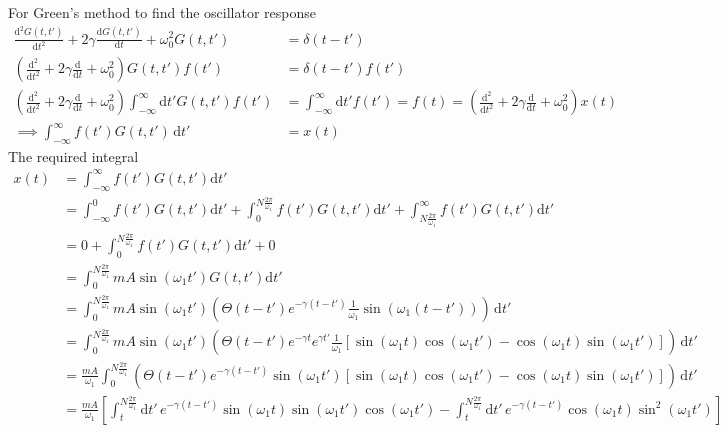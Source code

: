 \documentclass[10pts, letterpaper]{article}
\begin{document}
For Green's method to find the oscillator response
\begin{align*}
	\frac{\mathrm{d} ^2G(t,t')}{\mathrm{d} t^2 	 }
	+ 
2 \gamma	\frac{\mathrm{d} G(t,t')}{\mathrm{d} t} 
+ 
\omega_0^2 G(t,t') &= \delta(t - t')\\
\left(
\frac{\mathrm{d} ^2}{\mathrm{d} t^2} + 2 \gamma \frac{\mathrm{d} }{\mathrm{d} t} + \omega_0
^2\right) G(t, t') f(t') &=  \delta(t - t') f(t') \\ 
\left(
\frac{\mathrm{d} ^2}{\mathrm{d} t^2} + 2 \gamma \frac{\mathrm{d} }{\mathrm{d} t} + \omega_0
^2 \right) 
\int_{-\infty}^{\infty} \mathrm{d} t' G(t, t') f(t') &= \int_{-\infty}^{\infty} \mathrm{d} t' f(t') = f(t) =   
\left(
\frac{\mathrm{d} ^2}{\mathrm{d} t^2} + 2 \gamma \frac{\mathrm{d} }{\mathrm{d} t} + \omega_0
^2 \right)  x(t) \\
\implies 
\int_{-\infty}^{\infty} f(t') G(t, t') \, \mathrm{d} t' &= 
x(t)
\end{align*}
The required integral 
\begin{align*} x(t) &=   
	\int_{-\infty}^{\infty} f(t') G(t,t') \mathrm{d} t' \\ & = 
	\int_{-\infty}^{0} f(t') G(t,t') \mathrm{d} t' + 
	\int_{0}^{N \frac{2\pi }{\omega_1}} f(t') G(t,t') \mathrm{d} t' + 
	\int_{N \frac{2 \pi }{\omega_1}}^{\infty} f(t') G(t,t') \mathrm{d} t'  \\ 
	&=  0 + \int_{0}^{N \frac{2\pi }{\omega_1}} f(t') G(t,t') \mathrm{d} t' +  0 \\
	&= \int_{0}^{N \frac{2  \pi }{\omega_1 }}   mA \sin( \omega_1 t' ) G(t,t') \mathrm{d} t' \\
	&= 
\int_{0}^{N \frac{2 \pi }{\omega_1}}  
m A \sin ( \omega_1 t') 
\left(
\Theta(t - t') e^{ - \gamma (t - t' ) } 
\frac{1}{\omega_1 } \sin 
\left(
\omega_1 (t - t' )
\right)
\right)\, \mathrm{d} t' 
	\\
	&= 
\int_{0}^{N \frac{2 \pi }{\omega_1}}  
m A \sin ( \omega_1 t') 
\left(
\Theta(t - t') e^{- \gamma t} e^{\gamma t ' }
\frac{1}{\omega_1 } 
\left[
\sin(\omega_1 t) \cos(\omega_1 t' ) - 
\cos(\omega_1 t) \sin(\omega_1 t') 
\right]
\right)\, \mathrm{d} t' 
	\\
	&= \frac{m A}{\omega_1}  
\int_{0}^{N \frac{2 \pi }{\omega_1}}  
\left(
 \Theta(t - t') e^{- \gamma (t - t' ) } \sin(\omega_1 t' )
\left[
\sin(\omega_1 t) \cos(\omega_1 t' ) - 
\cos(\omega_1 t) \sin(\omega_1 t') 
\right]
\right)\, \mathrm{d} t' 
	\\ 
 &= \frac{m A}{\omega_1}  
\left[
 \int_{t}^{N \frac{2 \pi }{\omega_1}}   \mathrm{d} t'\, 
e^{ - \gamma (t - t ') }
\sin(\omega_1 t) \sin(\omega_1 t') \cos(\omega_1 t' ) - 
\int_{t}^{N \frac{2 \pi }{\omega_1}}   \mathrm{d} t' \,
e^{ - \gamma  (t - t ') }
\cos(\omega_1 t) \sin^2(\omega_1 t') 
\right] \tag{note lower bound of integration has changed to $t$} 
\end{align*}
\end{document}
